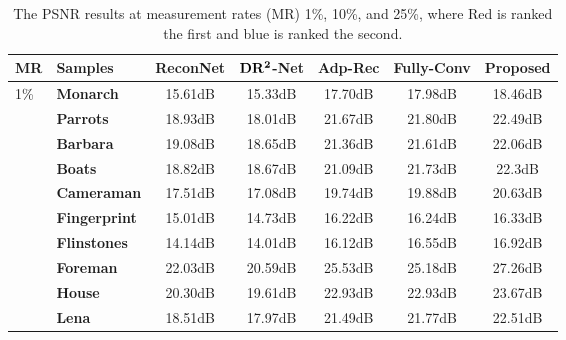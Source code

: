\documentclass[review]{elsarticle}
\begin{document}
\begin{table}[h!]
	\centering
	\footnotesize
	\caption{The PSNR results at measurement rates (MR) 1\%, 10\%, and 25\%, where Red is ranked the first and blue is ranked the second.}
	\label{tab:PSNR}
	\renewcommand\arraystretch{0.8}
	\begin{tabular}{|p{0.5cm}|p{1.7cm}ccccc|}
		\hline
		\rowcolor[HTML]{87B0FF}
		\textbf{MR} & \textbf{Samples}           & \textbf{ReconNet} & \textbf{$\bf{DR^2}$-Net} & \textbf{Adp-Rec}               & \textbf{Fully-Conv}            & \textbf{Proposed}              \\ \hline
		\multirow{12}{0.5cm}{1\%} & \textbf{Monarch}          & 15.61dB           & 15.33dB                       & {17.70dB} & {\color[HTML]{0000FF} 17.98dB} & {\color[HTML]{CC0000} 18.46dB} \\
		& \textbf{Parrots}          & 18.93dB           & 18.01dB                       & {21.67dB} & {\color[HTML]{0000FF} 21.80dB} & {\color[HTML]{CC0000} 22.49dB} \\
		& \textbf{Barbara}          & 19.08dB           & 18.65dB                       & {21.36dB} & {\color[HTML]{0000FF} 21.61dB} & {\color[HTML]{CC0000} 22.06dB} \\
		& \textbf{Boats}            & 18.82dB           & 18.67dB                       & {21.09dB} & {\color[HTML]{0000FF} 21.73dB} & {\color[HTML]{CC0000} 22.3dB}  \\
		& \textbf{Cameraman}        & 17.51dB           & 17.08dB                       & {19.74dB} & {\color[HTML]{0000FF} 19.88dB} & {\color[HTML]{CC0000} 20.63dB} \\
		& \textbf{Fingerprint} & 15.01dB           & 14.73dB                       & {16.22dB} & {\color[HTML]{0000FF} 16.24dB} & {\color[HTML]{CC0000} 16.33dB} \\
		& \textbf{Flinstones}  & 14.14dB           & 14.01dB                       & {16.12dB} & {\color[HTML]{0000FF} 16.55dB} & {\color[HTML]{CC0000} 16.92dB} \\
		& \textbf{Foreman}          & 22.03dB           & 20.59dB                       & {\color[HTML]{0000FF} 25.53dB} & {25.18dB} & {\color[HTML]{CC0000} 27.26dB} \\
		& \textbf{House}            & 20.30dB           & 19.61dB                       & {\color[HTML]{0000FF} 22.93dB} & {\color[HTML]{0000FF} 22.93dB} & {\color[HTML]{CC0000} 23.67dB} \\
		& \textbf{Lena}             & 18.51dB           & 17.97dB                       & {21.49dB} & {\color[HTML]{0000FF} 21.77dB} & {\color[HTML]{CC0000} 22.51dB} \\

\end{tabular}
\end{table}
\end{document}
